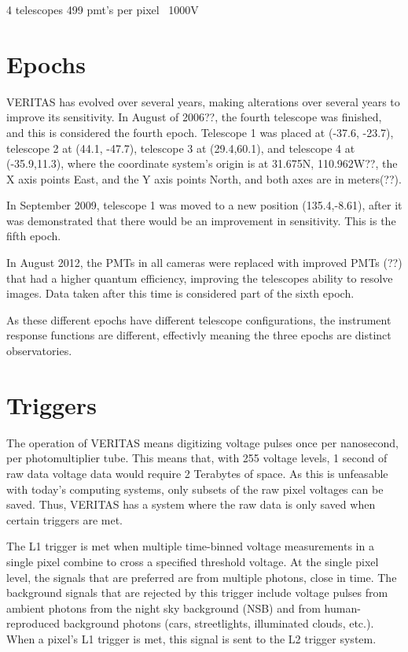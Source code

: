 4 telescopes
499 pmt's per pixel
~1000V

\section{Epochs}\label{sec:epochs}
VERITAS has evolved over several years, making alterations over several years to improve its sensitivity.
In August of 2006??, the fourth telescope was finished, and this is considered the fourth epoch.
Telescope 1 was placed at (-37.6, -23.7), telescope 2 at (44.1, -47.7), telescope 3 at (29.4,60.1), and telescope 4 at (-35.9,11.3), where the coordinate system's origin is at 31.675N, 110.962W??, the X axis points East, and the Y axis points North, and both axes are in meters(??).

In September 2009, telescope 1 was moved to a new position (135.4,-8.61), after it was demonstrated that there would be an improvement in sensitivity.
This is the fifth epoch.

In August 2012, the PMTs in all cameras were replaced with improved PMTs (??) that had a higher quantum efficiency, improving the telescopes ability to resolve images.
Data taken after this time is considered part of the sixth epoch.

As these different epochs have different telescope configurations, the instrument response functions are different, effectivly meaning the three epochs are distinct observatories.


\section{Triggers}\label{sec:trig}

The operation of VERITAS means digitizing voltage pulses once per nanosecond, per photomultiplier tube.
This means that, with 255 voltage levels, 1 second of raw data voltage data would require 2 Terabytes of space.
As this is unfeasable with today's computing systems, only subsets of the raw pixel voltages can be saved.
Thus, VERITAS has a system where the raw data is only saved when certain triggers are met.

The L1 trigger is met when multiple time-binned voltage measurements in a single pixel combine to cross a specified threshold voltage.
At the single pixel level, the signals that are preferred are from multiple photons, close in time.
The background signals that are rejected by this trigger include voltage pulses from ambient photons from the night sky background (NSB) and from human-reproduced background photons (cars, streetlights, illuminated clouds, etc.).
When a pixel's L1 trigger is met, this signal is sent to the L2 trigger system.

